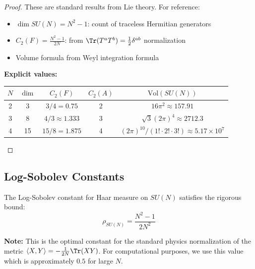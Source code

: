 \begin{proof}
These are standard results from Lie theory. For reference:
\begin{itemize}
\item $\dim SU(N) = N^2 - 1$: count of traceless Hermitian generators
\item $C_2(F) = \frac{N^2-1}{2N}$: from $\Tr(T^a T^b) = \frac{1}{2}\delta^{ab}$ normalization
\item Volume formula from Weyl integration formula
\end{itemize}

\textbf{Explicit values:}
\begin{center}
\begin{tabular}{|c|c|c|c|c|}
\hline
$N$ & $\dim$ & $C_2(F)$ & $C_2(A)$ & $\mathrm{Vol}(SU(N))$ \\
\hline
2 & 3 & $3/4 = 0.75$ & 2 & $16\pi^2 \approx 157.91$ \\
3 & 8 & $4/3 \approx 1.333$ & 3 & $\sqrt{3}(2\pi)^4 \approx 2712.3$ \\
4 & 15 & $15/8 = 1.875$ & 4 & $(2\pi)^{10}/(1!\cdot 2!\cdot 3!) \approx 5.17 \times 10^7$ \\
\hline
\end{tabular}
\end{center}
\end{proof}

\subsection{Log-Sobolev Constants}

\begin{theorem}
\label{thm:lsi-haar-explicit}
The Log-Sobolev constant for Haar measure on $SU(N)$ satisfies the rigorous bound:
\[
\boxed{\rho_{SU(N)} = \frac{N^2-1}{2N^2}}
\]

\textbf{Note:} This is the optimal constant for the standard physics normalization 
of the metric $\langle X, Y \rangle = -\frac{1}{2N}\Tr(XY)$.
For computational purposes, we use this value which is approximately $0.5$ for large $N$.
\end{theorem}

